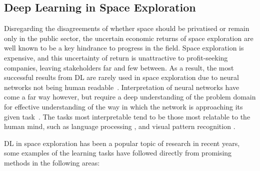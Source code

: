 \newpage\subsection{Deep Learning in Space Exploration}

Disregarding the disagreements of whether space should be privatised or remain
only in the public sector, the uncertain economic returns of space exploration
are well known to be a key hindrance to progress in the field. Space
exploration is expensive, and this uncertainty of return is unattractive to
profit-seeking companies, leaving stakeholders far and few between. As a result,
the most successful results from \gls{DL} are rarely used in space exploration
due to neural networks not being human readable~\cite{esa_ai}. Interpretation of
neural networks have come a far way however, but require a deep understanding
of the problem domain for effective understanding of the way in which the
network is approaching its given task~\cite{Montavon2018, Sheu2020,
goh2021multimodal, molnar_2022}. The tasks most interpretable tend to be those
most relatable to the human mind, such as language
processing
\cite{belinkov-etal-2020-interpretability, DBLP:journals/corr/abs-2108-04840},
and visual pattern recognition \cite{DBLP:journals/corr/abs-1802-00121}.

\gls{DL} in space exploration has been a popular topic of research in recent
years, some examples of the learning tasks have followed directly from
promising methods in the following areas:

